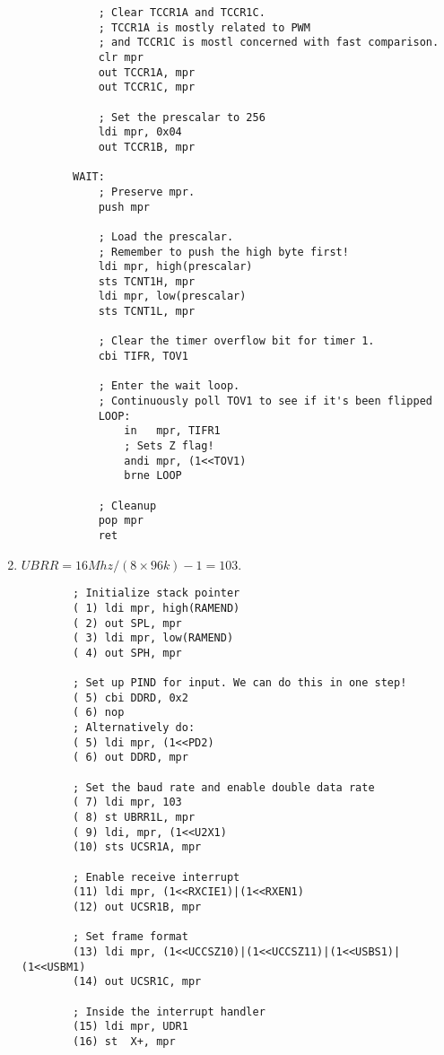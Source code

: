 \documentclass[12pt,letterpaper]{article}
\begin{document}
\begin{enumerate}
\begin{verbatim}
            ; Clear TCCR1A and TCCR1C.
            ; TCCR1A is mostly related to PWM
            ; and TCCR1C is mostl concerned with fast comparison.
            clr mpr
            out TCCR1A, mpr
            out TCCR1C, mpr

            ; Set the prescalar to 256
            ldi mpr, 0x04
            out TCCR1B, mpr

        WAIT:
            ; Preserve mpr.
            push mpr

            ; Load the prescalar.
            ; Remember to push the high byte first!
            ldi mpr, high(prescalar)
            sts TCNT1H, mpr
            ldi mpr, low(prescalar)
            sts TCNT1L, mpr

            ; Clear the timer overflow bit for timer 1.
            cbi TIFR, TOV1

            ; Enter the wait loop.
            ; Continuously poll TOV1 to see if it's been flipped
            LOOP:
                in   mpr, TIFR1
                ; Sets Z flag!
                andi mpr, (1<<TOV1)
                brne LOOP

            ; Cleanup
            pop mpr
            ret
    \end{verbatim}
    \item $UBRR = 16 Mhz/(8 \times 96k) -1 = 103$.
    \begin{verbatim}
        ; Initialize stack pointer
        ( 1) ldi mpr, high(RAMEND)
        ( 2) out SPL, mpr
        ( 3) ldi mpr, low(RAMEND)
        ( 4) out SPH, mpr

        ; Set up PIND for input. We can do this in one step!
        ( 5) cbi DDRD, 0x2
        ( 6) nop
        ; Alternatively do:
        ( 5) ldi mpr, (1<<PD2)
        ( 6) out DDRD, mpr

        ; Set the baud rate and enable double data rate
        ( 7) ldi mpr, 103
        ( 8) st UBRR1L, mpr
        ( 9) ldi, mpr, (1<<U2X1)
        (10) sts UCSR1A, mpr

        ; Enable receive interrupt
        (11) ldi mpr, (1<<RXCIE1)|(1<<RXEN1)
        (12) out UCSR1B, mpr

        ; Set frame format
        (13) ldi mpr, (1<<UCCSZ10)|(1<<UCCSZ11)|(1<<USBS1)|(1<<USBM1)
        (14) out UCSR1C, mpr

        ; Inside the interrupt handler
        (15) ldi mpr, UDR1
        (16) st  X+, mpr
    \end{verbatim}
\end{enumerate}
\end{document}
